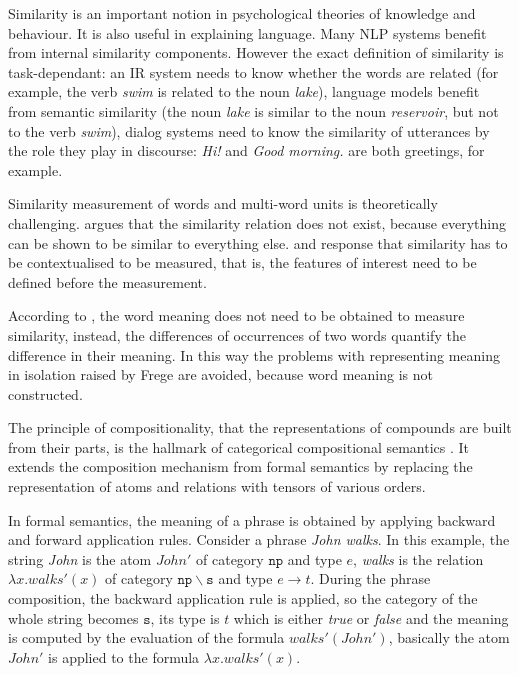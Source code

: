 Similarity is an important notion in psychological theories of knowledge and behaviour. It is also useful in explaining language. Many NLP systems benefit from internal similarity components. However the exact definition of similarity is task-dependant: an IR system needs to know whether the words are related (for example, the verb \textit{swim} is related to the noun \textit{lake}), language models benefit from semantic similarity (the noun \textit{lake} is similar to the noun \textit{reservoir}, but not to the verb \textit{swim}), dialog systems need to know the similarity of utterances by the role they play in  discourse: \textit{Hi!} and \textit{Good morning.} are both greetings, for example.

Similarity measurement of words and multi-word units is theoretically challenging.  argues that the similarity relation does not exist, because everything can be shown to be similar to everything else.  and  response that similarity has to be contextualised to be measured, that is, the features of interest need to be defined before the measurement.

According to , the word meaning does not need to be obtained to measure similarity, instead, the differences of occurrences of two words quantify the difference in their meaning. In this way the problems with representing meaning in isolation raised by Frege are avoided, because word meaning is not constructed.

The principle of compositionality, that the representations of compounds are built from their parts, is the hallmark of categorical compositional semantics \cite{DBLP:journals/corr/abs-1003-4394}. It extends the composition mechanism from formal semantics by replacing the representation of atoms and relations with tensors of various orders.

In formal semantics, the meaning of a phrase is obtained by applying backward and forward application rules. Consider a phrase \textit{John walks}. In this example, the string \textit{John} is the atom $\mathit{John'}$ of category $\mathtt{np}$ and type $e$, \textit{walks} is the relation $\lambda x.\mathit{walks'}(x)$ of category $\mathtt{np\backslash{}s}$ and type $e \to t$. During the phrase composition, the backward application rule is applied, so the category of the whole string becomes $\mathtt{s}$, its type is $t$ which is either \textit{true} or \textit{false} and the meaning is computed by the evaluation of the formula $\mathit{walks'}(\mathit{John'})$, basically the atom $\mathit{John'}$ is applied to the formula $\lambda x.\mathit{walks'(x)}$.

